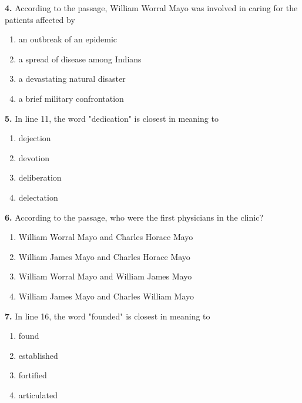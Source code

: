 \documentclass[12pt]{article}
\begin{document}
\par
\vspace{0.25\baselineskip}
\noindent\textbf{4.} According to the passage, William Worral Mayo was involved in caring for the patients affected by
\begin{enumerate}[label=(\Alph*),leftmargin=*,itemsep=0.2em]
\item an outbreak of an epidemic
\item a spread of disease among Indians
\item a devastating natural disaster
\item a brief military confrontation
\end{enumerate}
\par
\vspace{0.25\baselineskip}
\noindent\textbf{5.} In line 11, the word "dedication" is closest in meaning to
\begin{enumerate}[label=(\Alph*),leftmargin=*,itemsep=0.2em]
\item dejection
\item devotion
\item deliberation
\item delectation
\end{enumerate}
\par
\vspace{0.25\baselineskip}
\noindent\textbf{6.} According to the passage, who were the first physicians in the clinic?
\begin{enumerate}[label=(\Alph*),leftmargin=*,itemsep=0.2em]
\item William Worral Mayo and Charles Horace Mayo
\item William James Mayo and Charles Horace Mayo
\item William Worral Mayo and William James Mayo
\item William James Mayo and Charles William Mayo
\end{enumerate}
\par
\vspace{0.25\baselineskip}
\noindent\textbf{7.} In line 16, the word "founded" is closest in meaning to
\begin{enumerate}[label=(\Alph*),leftmargin=*,itemsep=0.2em]
\item found
\item established
\item fortified
\item articulated
\end{enumerate}
\par
\end{document}
